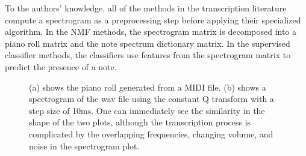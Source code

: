 \documentclass[5p]{elsarticle}
\begin{document}
To the authors' knowledge, all of the methods in the transcription literature compute a spectrogram as a preprocessing step before applying their specialized algorithm. In the NMF methods, the spectrogram matrix is decomposed into a piano roll matrix and the note spectrum dictionary matrix. In the supervised classifier methods, the classifiers use features from the spectrogram matrix to predict the presence of a note. 


\begin{figure}[t]
\begin{center}
\end{center}
\caption{(a) shows the piano roll generated from a MIDI file. (b) shows a spectrogram of the wav file using the constant Q transform with a step size of 10ms. One can immediately see the similarity in the shape of the two plots, although the transcription process is complicated by the overlapping frequencies, changing volume, and noise in the spectrogram plot.}
\end{figure}
\end{document}
